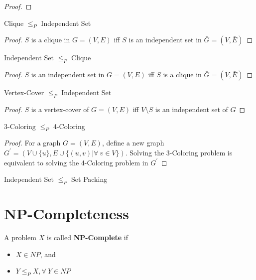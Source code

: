 			\begin{proof}
				
			\end{proof}

			\begin{lemma}
				Clique $\le_P$ Independent Set
			\end{lemma}

			\begin{proof}
				$S$ is a clique in $G = (V, E)$ iff $S$ is an independent set in $\bar{G} = (V, \bar{E})$
			\end{proof}

			\begin{lemma}
				Independent Set $\le_P$ Clique
			\end{lemma}

			\begin{proof}
				$S$ is an independent set in $G = (V, E)$ iff $S$ is a clique in $\bar{G} = (V, \bar{E})$
			\end{proof}

			\begin{lemma}
				Vertex-Cover $\le_P$ Independent Set
			\end{lemma}

			\begin{proof}
				$S$ is a vertex-cover of $G = (V, E)$ iff $V \setminus S$ is an independent set of $G$
			\end{proof}

			\begin{lemma}
				3-Coloring $\le_P$ 4-Coloring
			\end{lemma}

			\begin{proof}
				For a graph $G = (V, E)$, define a new graph $G^\prime = (V \cup \{u\}, E \cup \{(u, v) | \forall ~ v \in V\})$. Solving the 3-Coloring problem is equivalent to solving the 4-Coloring problem in $G^\prime$
			\end{proof}

			\begin{lemma}
				Independent Set $\le_P$ Set Packing
			\end{lemma}

		\section{NP-Completeness}
			\begin{definition}[NP-Completeness]
				A problem $X$ is called \textbf{NP-Complete} if
				\begin{itemize}
					\item $X \in NP$, and
					\item $Y \le_P X, \forall ~ Y \in NP$
				\end{itemize}
			\end{definition}


